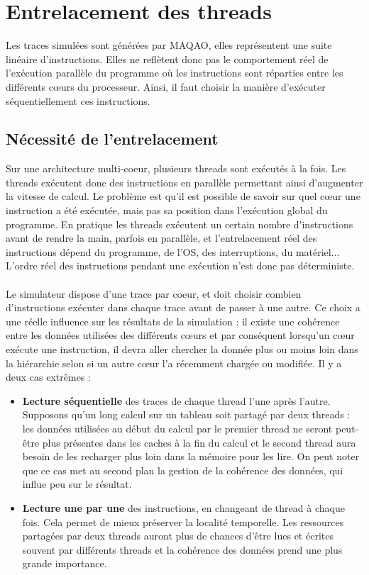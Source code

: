 \section{Entrelacement des threads}

Les traces simulées sont générées par \textsf{MAQAO}, elles représentent une suite linéaire d'instructions. Elles ne reflètent donc pas le comportement réel de l'exécution parallèle du programme où les instructions sont réparties entre les différents c\oe urs du processeur. Ainsi, il faut choisir la manière d'exécuter séquentiellement ces instructions.

\subsection{Nécessité de l'entrelacement}

Sur une architecture multi-coeur, plusieurs threads sont exécutés à la fois. Les threads exécutent donc des instructions en parallèle permettant ainsi d'augmenter la vitesse de calcul. Le problème est qu'il est possible de savoir sur quel c\oe ur une instruction a été exécutée, mais pas sa position dans l'exécution global du programme. En pratique les threads exécutent un certain nombre d'instructions avant de rendre la main, parfois en parallèle, et l'entrelacement réel des instructions dépend du programme, de l'OS, des interruptions, du matériel... L'ordre réel des instructions pendant une exécution n'est donc pas déterministe.

\paragraph{}
Le simulateur dispose d'une trace par coeur, et doit choisir combien d'instructions exécuter dans chaque trace avant de passer à une autre. Ce choix a une réelle influence sur les résultats de la simulation : il existe une cohérence entre les données utilisées des différents c\oe urs et par conséquent lorsqu'un c\oe ur exécute une instruction, il devra aller chercher la donnée plus ou moins loin dans la hiérarchie selon si un autre c\oe ur l'a récemment chargée ou modifiée. Il y a deux cas extrêmes :

\begin{itemize}
  \item \textbf{Lecture séquentielle} des traces de chaque thread l'une après l'autre. Supposons qu'un long calcul sur un tableau soit partagé par deux threads : les données utilisées au début du calcul par le premier thread ne seront peut-être plus présentes dans les caches à la fin du calcul et le second thread aura besoin de les recharger plus loin dans la mémoire pour les lire. On peut noter que ce cas met au second plan la gestion de la cohérence des données, qui influe peu sur le résultat.
  \item \textbf{Lecture une par une} des instructions, en changeant de thread à chaque fois. Cela permet de mieux préserver la localité temporelle. Les ressources partagées par deux threads auront plus de chances d'être lues et écrites souvent par différents threads et la cohérence des données prend une plus grande importance.
\end{itemize} 

